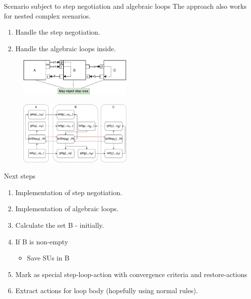 \documentclass{beamer}
\begin{document}
\begin{frame}{Scenario subject to step negotiation and algebraic loops}
    The approach also works for nested complex scenarios.
    \begin{enumerate}
        \item Handle the step negotiation.
        \item Handle the algebraic loops inside.
    \end{enumerate}

    \begin{figure}    
        \includegraphics[width=0.5\textwidth]{images/loop_within_loop.pdf}
    \end{figure}
    \begin{figure}   
        \includegraphics[width=0.5\textwidth]{images/nested_graph.pdf}
    \end{figure}
\end{frame}

\begin{frame}{Next steps}
    \begin{enumerate}
        \item Implementation of step negotiation.
        \item Implementation of algebraic loops.
        \item Calculate the set B - initially.
        \item If B is non-empty
        \begin{itemize}
            \item Save SUs in B
        \end{itemize}
        \item Mark as special step-loop-action with convergence criteria and restore-actions
        \item Extract actions for loop body (hopefully using normal rules).
    \end{enumerate}  
\end{frame}
\end{document}
